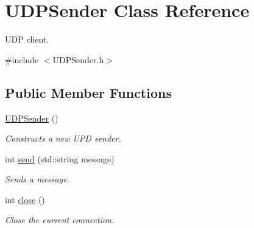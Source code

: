 \hypertarget{class_u_d_p_sender}{}\section{U\+D\+P\+Sender Class Reference}
\label{class_u_d_p_sender}


U\+DP client.  




{\ttfamily \#include $<$U\+D\+P\+Sender.\+h$>$}

\subsection*{Public Member Functions}
\begin{DoxyCompactItemize}
\item 
\hypertarget{class_u_d_p_sender_a77c0f2eb66dbc9a912b4fede20de3f03}{}\label{class_u_d_p_sender_a77c0f2eb66dbc9a912b4fede20de3f03} 
\hyperlink{class_u_d_p_sender_a77c0f2eb66dbc9a912b4fede20de3f03}{U\+D\+P\+Sender} ()
\begin{DoxyCompactList}\small\item\em Constructs a new U\+PD sender. \end{DoxyCompactList}\item 
int \hyperlink{class_u_d_p_sender_a33d402a42a2d512bd12189e1f698cca4}{send} (std\+::string message)
\begin{DoxyCompactList}\small\item\em Sends a message. \end{DoxyCompactList}\item 
\hypertarget{class_u_d_p_sender_a9633801c0b923a53d42061f2233d06ef}{}\label{class_u_d_p_sender_a9633801c0b923a53d42061f2233d06ef} 
int \hyperlink{class_u_d_p_sender_a9633801c0b923a53d42061f2233d06ef}{close} ()
\begin{DoxyCompactList}\small\item\em Close the current connection. \end{DoxyCompactList}\end{DoxyCompactItemize}

